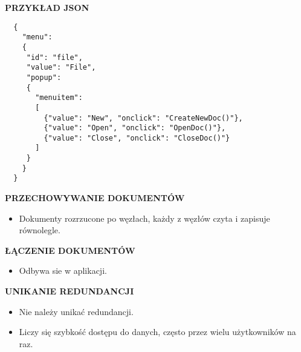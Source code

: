 \pagebreak

\textbf{PRZYKŁAD JSON}
\begin{verbatim}
  {
    "menu":
    {
     "id": "file",
     "value": "File",
     "popup":
     {
       "menuitem":
       [
         {"value": "New", "onclick": "CreateNewDoc()"},
         {"value": "Open", "onclick": "OpenDoc()"},
         {"value": "Close", "onclick": "CloseDoc()"}
       ]
     }
    }
  }
\end{verbatim}

\textbf{PRZECHOWYWANIE DOKUMENTÓW}
\begin{itemize}
    \item Dokumenty rozrzucone po węzłach, każdy z węzłów czyta i zapisuje
          równolegle.
\end{itemize}

\textbf{ŁĄCZENIE DOKUMENTÓW}
\begin{itemize}
    \item Odbywa sie w aplikacji.
\end{itemize}

\textbf{UNIKANIE REDUNDANCJI}
\begin{itemize}
    \item Nie należy unikać redundancji.
    \item Liczy się szybkość dostępu do danych, często przez wielu
          użytkowników na raz.
\end{itemize}
